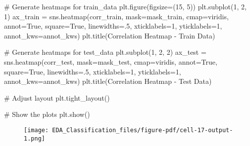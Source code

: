\documentclass[
  letterpaper,
  DIV=11,
  numbers=noendperiod]{scrartcl}
\newenvironment{Shaded}{\begin{snugshade}}{\end{snugshade}}
\newcommand{\CommentTok}[1]{\textcolor[rgb]{0.37,0.37,0.37}{#1}}
\newcommand{\DecValTok}[1]{\textcolor[rgb]{0.68,0.00,0.00}{#1}}
\newcommand{\FloatTok}[1]{\textcolor[rgb]{0.68,0.00,0.00}{#1}}
\newcommand{\NormalTok}[1]{\textcolor[rgb]{0.00,0.23,0.31}{#1}}
\newcommand{\OperatorTok}[1]{\textcolor[rgb]{0.37,0.37,0.37}{#1}}
\newcommand{\StringTok}[1]{\textcolor[rgb]{0.13,0.47,0.30}{#1}}
\newcommand{\VariableTok}[1]{\textcolor[rgb]{0.07,0.07,0.07}{#1}}
\begin{document}
\begin{Shaded}
\begin{Highlighting}[]
\CommentTok{\# Generate heatmaps for train\_data}
\NormalTok{plt.figure(figsize}\OperatorTok{=}\NormalTok{(}\DecValTok{15}\NormalTok{, }\DecValTok{5}\NormalTok{))}
\NormalTok{plt.subplot(}\DecValTok{1}\NormalTok{, }\DecValTok{2}\NormalTok{, }\DecValTok{1}\NormalTok{)}
\NormalTok{ax\_train }\OperatorTok{=}\NormalTok{ sns.heatmap(corr\_train, mask}\OperatorTok{=}\NormalTok{mask\_train, cmap}\OperatorTok{=}\StringTok{\textquotesingle{}viridis\textquotesingle{}}\NormalTok{, annot}\OperatorTok{=}\VariableTok{True}\NormalTok{,}
\NormalTok{                      square}\OperatorTok{=}\VariableTok{True}\NormalTok{, linewidths}\OperatorTok{=}\FloatTok{.5}\NormalTok{, xticklabels}\OperatorTok{=}\DecValTok{1}\NormalTok{, yticklabels}\OperatorTok{=}\DecValTok{1}\NormalTok{, annot\_kws}\OperatorTok{=}\NormalTok{annot\_kws)}
\NormalTok{plt.title(}\StringTok{\textquotesingle{}Correlation Heatmap {-} Train Data\textquotesingle{}}\NormalTok{)}

\CommentTok{\# Generate heatmaps for test\_data}
\NormalTok{plt.subplot(}\DecValTok{1}\NormalTok{, }\DecValTok{2}\NormalTok{, }\DecValTok{2}\NormalTok{)}
\NormalTok{ax\_test }\OperatorTok{=}\NormalTok{ sns.heatmap(corr\_test, mask}\OperatorTok{=}\NormalTok{mask\_test, cmap}\OperatorTok{=}\StringTok{\textquotesingle{}viridis\textquotesingle{}}\NormalTok{, annot}\OperatorTok{=}\VariableTok{True}\NormalTok{,}
\NormalTok{                     square}\OperatorTok{=}\VariableTok{True}\NormalTok{, linewidths}\OperatorTok{=}\FloatTok{.5}\NormalTok{, xticklabels}\OperatorTok{=}\DecValTok{1}\NormalTok{, yticklabels}\OperatorTok{=}\DecValTok{1}\NormalTok{, annot\_kws}\OperatorTok{=}\NormalTok{annot\_kws)}
\NormalTok{plt.title(}\StringTok{\textquotesingle{}Correlation Heatmap {-} Test Data\textquotesingle{}}\NormalTok{)}

\CommentTok{\# Adjust layout}
\NormalTok{plt.tight\_layout()}

\CommentTok{\# Show the plots}
\NormalTok{plt.show()}
\end{Highlighting}
\end{Shaded}

\begin{figure}[H]

{\centering \texttt{[image: EDA\_Classification\_files/figure-pdf/cell-17-output-1.png]}

}

\end{figure}
\end{document}
